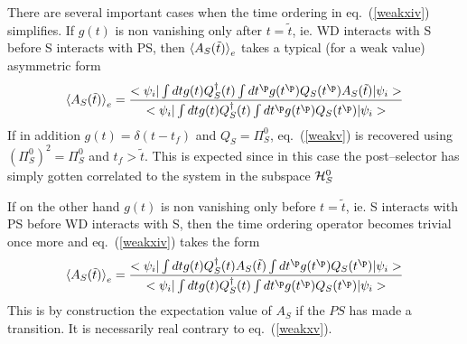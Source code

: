There are
several important cases when the time ordering in eq.~(\ref{weakxiv})
simplifies.
If $g(t)$ is non vanishing only after $t=\tilde t$, ie. WD interacts with S
before S interacts with PS, then $\mbox{$ \langle A_{S}(\tilde t) \rangle $}_{e}$  takes a
typical (for a weak value) asymmetric form
\begin{equation}
 \bk{A_{S}(\tilde t)}_{e} =  {
\bi \int dt g(t) Q_S^\dagger (t)
 \int dt^\p g(t^\p) Q_S(t^\p)  A_S(\tilde t) \ki \over \bi \int dt g(t)
Q_S^\dagger
(t) \int dt^\p g(t^\p) Q_S(t^\p) \ki} \label{weakxv} \end{equation}
If in addition $g(t)=\delta(t-t_f)$
and $Q_S=\Pi_S^0$,
eq.~(\ref{weakv}) is recovered using $ (\Pi_S^0)^2 = \Pi_S^0$ and
$t_f >\tilde t$. This
is expected since in this case the post--selector has simply gotten
correlated to the system in the subspace ${\cal H}^0_S$

If on the other hand $g(t)$ is non vanishing only before $t=\tilde t$, ie. S
interacts with PS before WD interacts with S, then the time
ordering operator becomes trivial once more and eq.~(\ref{weakxiv}) takes the
form \begin{equation}
\bk{A_{S}(\tilde t)}_{e} =  { \bi \int dt g(t)
Q_S^\dagger (t) A_S(\tilde t)
 \int dt^\p g(t^\p) Q_S(t^\p)   \ki \over \bi \int dt g(t) Q_S^\dagger (t)
\int dt^\p g(t^\p) Q_S(t^\p) \ki} \label{weakxvi}
\end{equation}
This is by construction the
 expectation value of $A_S$ if the $PS$ has made a transition.
It is
necessarily real contrary to  eq.~(\ref{weakxv}).

